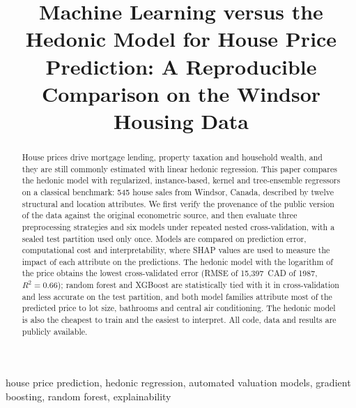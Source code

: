 \documentclass[conference]{IEEEtran}
\begin{document}
\title{Machine Learning versus the Hedonic Model for House Price Prediction: A Reproducible Comparison on the Windsor Housing Data}

\author{
}

\maketitle

\begin{abstract}
House prices drive mortgage lending, property taxation and household wealth, and they are still commonly estimated with linear hedonic regression. This paper compares the hedonic model with regularized, instance-based, kernel and tree-ensemble regressors on a classical benchmark: 545 house sales from Windsor, Canada, described by twelve structural and location attributes. We first verify the provenance of the public version of the data against the original econometric source, and then evaluate three preprocessing strategies and six models under repeated nested cross-validation, with a sealed test partition used only once. Models are compared on prediction error, computational cost and interpretability, where SHAP values are used to measure the impact of each attribute on the predictions. The hedonic model with the logarithm of the price obtains the lowest cross-validated error (RMSE of 15,397~CAD of 1987, $R^2 = 0.66$); random forest and XGBoost are statistically tied with it in cross-validation and less accurate on the test partition, and both model families attribute most of the predicted price to lot size, bathrooms and central air conditioning. The hedonic model is also the cheapest to train and the easiest to interpret. All code, data and results are publicly available.
\end{abstract}

\begin{IEEEkeywords}
house price prediction, hedonic regression, automated valuation models, gradient boosting, random forest, explainability
\end{IEEEkeywords}

\end{document}
